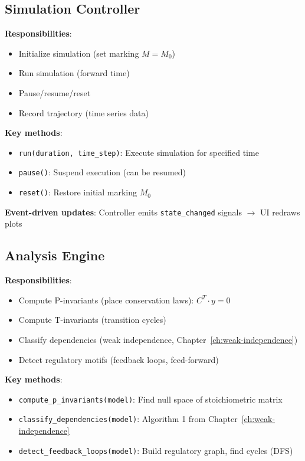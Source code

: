 \subsection{Simulation Controller}
\label{subsec:simulation-controller}

\textbf{Responsibilities}:

\begin{itemize}
    \item Initialize simulation (set marking $M = M_0$)
    \item Run simulation (forward time)
    \item Pause/resume/reset
    \item Record trajectory (time series data)
\end{itemize}

\textbf{Key methods}:

\begin{itemize}
    \item \texttt{run(duration, time\_step)}: Execute simulation for specified time
    \item \texttt{pause()}: Suspend execution (can be resumed)
    \item \texttt{reset()}: Restore initial marking $M_0$
\end{itemize}

\textbf{Event-driven updates}: Controller emits \texttt{state\_changed} signals $\to$ UI redraws plots

\subsection{Analysis Engine}
\label{subsec:analysis-engine}

\textbf{Responsibilities}:

\begin{itemize}
    \item Compute P-invariants (place conservation laws): $C^T \cdot y = 0$
    \item Compute T-invariants (transition cycles)
    \item Classify dependencies (weak independence, Chapter~\ref{ch:weak-independence})
    \item Detect regulatory motifs (feedback loops, feed-forward)
\end{itemize}

\textbf{Key methods}:

\begin{itemize}
    \item \texttt{compute\_p\_invariants(model)}: Find null space of stoichiometric matrix
    \item \texttt{classify\_dependencies(model)}: Algorithm 1 from Chapter~\ref{ch:weak-independence}
    \item \texttt{detect\_feedback\_loops(model)}: Build regulatory graph, find cycles (DFS)
\end{itemize}

